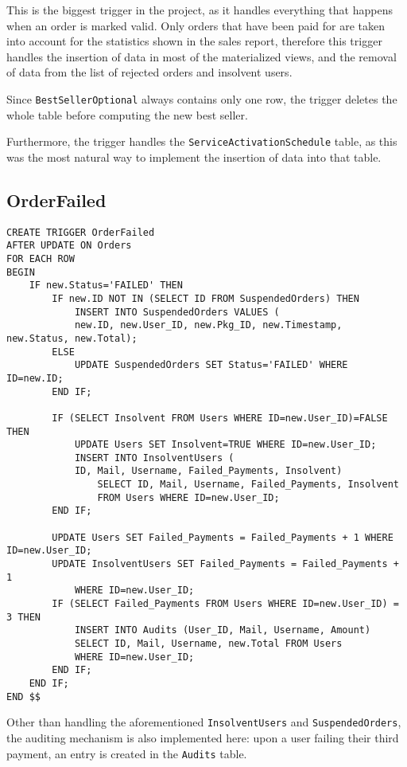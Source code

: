 This is the biggest trigger in the project, as it handles everything that happens when an order is marked valid. Only orders that have been paid for are taken into account for the statistics shown in the sales report, therefore this trigger handles the insertion of data in most of the materialized views, and the removal of data from the list of rejected orders and insolvent users.

Since \texttt{BestSellerOptional} always contains only one row, the trigger deletes the whole table before computing the new best seller.

Furthermore, the trigger handles the \texttt{ServiceActivationSchedule} table, as this was the most natural way to implement the insertion of data into that table.

\subsection{OrderFailed}

\begin{lstlisting}[style=SQL]
CREATE TRIGGER OrderFailed
AFTER UPDATE ON Orders
FOR EACH ROW
BEGIN
    IF new.Status='FAILED' THEN
        IF new.ID NOT IN (SELECT ID FROM SuspendedOrders) THEN
            INSERT INTO SuspendedOrders VALUES (
            new.ID, new.User_ID, new.Pkg_ID, new.Timestamp, new.Status, new.Total);
        ELSE
            UPDATE SuspendedOrders SET Status='FAILED' WHERE ID=new.ID;
        END IF;

        IF (SELECT Insolvent FROM Users WHERE ID=new.User_ID)=FALSE THEN
            UPDATE Users SET Insolvent=TRUE WHERE ID=new.User_ID;
            INSERT INTO InsolventUsers (
            ID, Mail, Username, Failed_Payments, Insolvent)
                SELECT ID, Mail, Username, Failed_Payments, Insolvent
                FROM Users WHERE ID=new.User_ID;
        END IF;

        UPDATE Users SET Failed_Payments = Failed_Payments + 1 WHERE ID=new.User_ID;
        UPDATE InsolventUsers SET Failed_Payments = Failed_Payments + 1
            WHERE ID=new.User_ID;
        IF (SELECT Failed_Payments FROM Users WHERE ID=new.User_ID) = 3 THEN
            INSERT INTO Audits (User_ID, Mail, Username, Amount)
            SELECT ID, Mail, Username, new.Total FROM Users
            WHERE ID=new.User_ID;
        END IF;
    END IF;
END $$
\end{lstlisting}

Other than handling the aforementioned \texttt{InsolventUsers} and \texttt{SuspendedOrders}, the auditing mechanism is also implemented here: upon a user failing their third payment, an entry is created in the \texttt{Audits} table.

